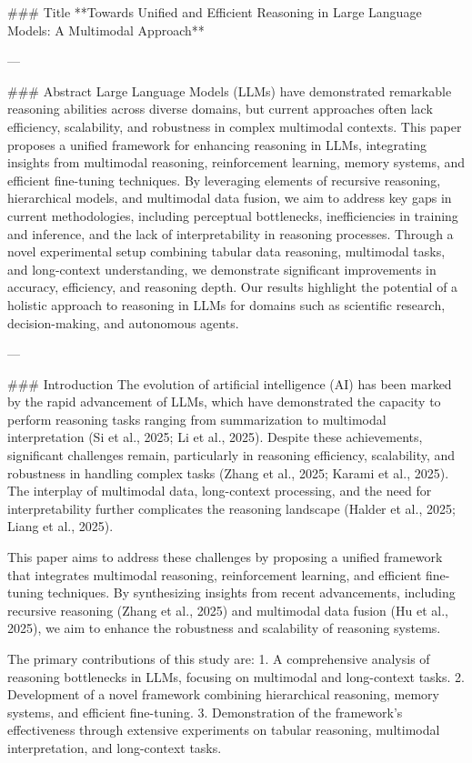 ### Title  
**Towards Unified and Efficient Reasoning in Large Language Models: A Multimodal Approach**

---

### Abstract  
Large Language Models (LLMs) have demonstrated remarkable reasoning abilities across diverse domains, but current approaches often lack efficiency, scalability, and robustness in complex multimodal contexts. This paper proposes a unified framework for enhancing reasoning in LLMs, integrating insights from multimodal reasoning, reinforcement learning, memory systems, and efficient fine-tuning techniques. By leveraging elements of recursive reasoning, hierarchical models, and multimodal data fusion, we aim to address key gaps in current methodologies, including perceptual bottlenecks, inefficiencies in training and inference, and the lack of interpretability in reasoning processes. Through a novel experimental setup combining tabular data reasoning, multimodal tasks, and long-context understanding, we demonstrate significant improvements in accuracy, efficiency, and reasoning depth. Our results highlight the potential of a holistic approach to reasoning in LLMs for domains such as scientific research, decision-making, and autonomous agents.

---

### Introduction  
The evolution of artificial intelligence (AI) has been marked by the rapid advancement of LLMs, which have demonstrated the capacity to perform reasoning tasks ranging from summarization to multimodal interpretation (Si et al., 2025; Li et al., 2025). Despite these achievements, significant challenges remain, particularly in reasoning efficiency, scalability, and robustness in handling complex tasks (Zhang et al., 2025; Karami et al., 2025). The interplay of multimodal data, long-context processing, and the need for interpretability further complicates the reasoning landscape (Halder et al., 2025; Liang et al., 2025).  

This paper aims to address these challenges by proposing a unified framework that integrates multimodal reasoning, reinforcement learning, and efficient fine-tuning techniques. By synthesizing insights from recent advancements, including recursive reasoning (Zhang et al., 2025) and multimodal data fusion (Hu et al., 2025), we aim to enhance the robustness and scalability of reasoning systems.  

The primary contributions of this study are:  
1. A comprehensive analysis of reasoning bottlenecks in LLMs, focusing on multimodal and long-context tasks.  
2. Development of a novel framework combining hierarchical reasoning, memory systems, and efficient fine-tuning.  
3. Demonstration of the framework's effectiveness through extensive experiments on tabular reasoning, multimodal interpretation, and long-context tasks.  


